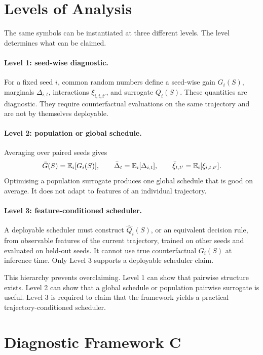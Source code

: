 \section{Levels of Analysis}
\label{sec:ch6-levels}

The same symbols can be instantiated at three different levels. The level
determines what can be claimed.

\paragraph{Level 1: seed-wise diagnostic.}
For a fixed seed $i$, common random numbers define a seed-wise gain
$G_i(S)$, marginals $\Delta_{i,t}$, interactions $\xi_{i,t,t'}$, and
surrogate $Q_i(S)$. These quantities are diagnostic. They require
counterfactual evaluations on the same trajectory and are not by themselves
deployable.

\paragraph{Level 2: population or global schedule.}
Averaging over paired seeds gives
\[
  \bar G(S)=\mathbb{E}_i[G_i(S)],
  \qquad
  \bar\Delta_t=\mathbb{E}_i[\Delta_{i,t}],
  \qquad
  \bar\xi_{t,t'}=\mathbb{E}_i[\xi_{i,t,t'}].
\]
Optimising a population surrogate produces one global schedule that is good on
average. It does not adapt to features of an individual trajectory.

\paragraph{Level 3: feature-conditioned scheduler.}
A deployable scheduler must construct $\widehat Q_i(S)$, or an equivalent
decision rule, from observable features of the current trajectory, trained on
other seeds and evaluated on held-out seeds. It cannot use true
counterfactual $G_i(S)$ at inference time. Only Level 3 supports a deployable
scheduler claim.

This hierarchy prevents overclaiming. Level 1 can show that pairwise structure
exists. Level 2 can show that a global schedule or population pairwise
surrogate is useful. Level 3 is required to claim that the framework yields a
practical trajectory-conditioned scheduler.

\section{Diagnostic Framework C}
\label{sec:ch6-framework-c}

